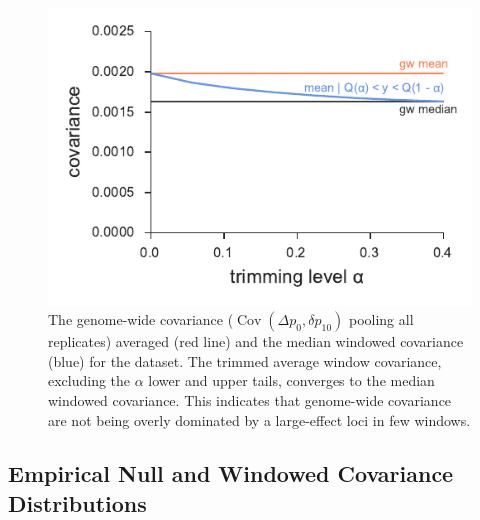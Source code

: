 \documentclass[11pt]{article}
\DeclareMathOperator{\cov}{Cov}
\begin{document}
\begin{figure}[!ht]
  \centering
  \includegraphics[]{figures/barghi-trimmed-mean.pdf}

  \caption{The genome-wide covariance ($\cov(\Delta p_0, \delta p_10)$ pooling
    all replicates) averaged (red line) and the median windowed covariance
    (blue) for the \textcite{Barghi2019-qy} dataset. The trimmed average window
    covariance, excluding the $\alpha$ lower and upper tails, converges to the
     median windowed covariance. This indicates that genome-wide covariance are
     not being overly dominated by a large-effect loci in few windows.}

  \label{suppfig:barghi-trimmed-mean}
\end{figure}



\clearpage
\subsection{\textcite{Barghi2019-qy} Empirical Null and Windowed Covariance Distributions}
\end{document}
